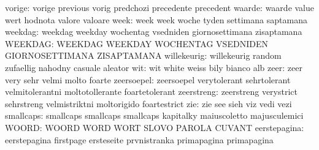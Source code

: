                    vorige: vorige                    previous
                           vorig                     predchozi
                           precedente                precedent
                   waarde: waarde                    value
                           wert                      hodnota
                           valore                    valoare
                     week: week                      week
                           woche                     tyden
                           settimana                 saptamana
                  weekdag: weekdag                   weekday
                           wochentag                 vsedniden
                           giornosettimana           zisaptamana
                  WEEKDAG: WEEKDAG                   WEEKDAY
                           WOCHENTAG                 VSEDNIDEN
                           GIORNOSETTIMANA           ZISAPTAMANA
              willekeurig: willekeurig               random
                           zufaellig                 nahodny
                           casuale                   aleator
                      wit: wit                       white
                           weiss                     bily
                           bianco                    alb
                     zeer: zeer                      very
                           sehr                      velmi
                           molto                     foarte
               zeersoepel: zeersoepel                verytolerant
                           sehrtolerant              velmitolerantni
                           moltotollerante           foartetolerant
               zeerstreng: zeerstreng                verystrict
                           sehrstreng                velmistriktni
                           moltorigido               foartestrict %
                      zie: zie                       see
                           sieh                      viz
                           vedi                      vezi
                smallcaps: smallcaps                 smallcaps
                           smallcaps                 kapitalky
                           maiuscoletto              majusculemici
                    WOORD: WOORD                     WORD
                           WORT                      SLOVO
                           PAROLA                    CUVANT
             eerstepagina: eerstepagina              firstpage
                           ersteseite                prvnistranka
                           primapagina               primapagina
